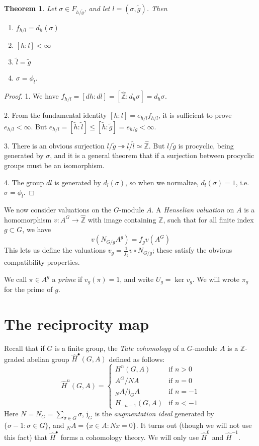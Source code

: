 \documentclass{article}
\newcommand{\bb}{\mathbb}
\newcommand{\f}{\mathfrak}
\newcommand{\frob}{F}
\newcommand{\hZ}{\hat{\mathbb{Z}}}
\newcommand{\tH}{\hat H}
\newtheorem{theorem}{Theorem}
\begin{document}
\begin{theorem}
Let $\sigma\in \frob_{h/\tilde g}$, and let $l=(\sigma,\tilde g)$. Then 
\begin{enumerate}
  \item $f_{h/l} = d_h(\sigma)$ 
  \item $[h:l]<\infty$
  \item $\tilde l = \tilde g$
  \item $\sigma = \phi_l$. 
\end{enumerate}
\end{theorem}
\begin{proof}
1. We have $f_{h/l} = [d h : d l] = [\hZ : d_h\sigma] = d_h\sigma$.

2. From the fundamental identity $[h:l] = e_{h/l} f_{h/l}$, it is sufficient to 
prove $e_{h/l}<\infty$. But 
$e_{h/l} = [\tilde h:\tilde l]\leqslant [\tilde h:\tilde g] = e_{h/g}<\infty$. 

3. There is an obvious surjection 
$l/\tilde g\twoheadrightarrow l/\tilde l\simeq \hZ$. But $l/\tilde g$ is 
procyclic, being generated by $\sigma$, and it is a general theorem that if a 
surjection between procyclic groups must be an isomorphism. 

4. The group $d l$ is generated by $d_l(\sigma)$, so when we normalize, 
$d_l(\sigma) = 1$, i.e. $\sigma = \phi_l$. 
\end{proof}

We now consider valuations on the $G$-module $A$. A \emph{Henselian valuation} 
on $A$ is a homomorphism $v:A^G\to \hZ$ with image containing $\bb Z$, such 
that for all finite index $g\subset G$, we have 
\[
  v(N_{G/g} A^g) = f_g v(A^G)
\]
This lets us define the valuations $v_g = \frac 1{f_g} v\circ N_{G/g}$; these 
satisfy the obvious compatibility properties. 

We call $\pi\in A^g$ a \emph{prime} if $v_g(\pi) = 1$, and write 
$U_g=\ker v_g$. We will wrote $\pi_g$ for the prime of $g$.





\section{The reciprocity map}

Recall that if $G$ is a finite group, the \emph{Tate cohomology} of a 
$G$-module $A$ is a $\bb Z$-graded abelian group $\tH^\bullet(G,A)$ defined as 
follows:
\[
  \tH^n(G,A) = \begin{cases}
                 H^n(G,A)         & \mbox{if $n>0$} \\
                 A^G / N A        & \mbox{if $n=0$} \\
                 _N A/\f j_G A    & \mbox{if $n=-1$} \\
                 H_{-n-1}(G,A)    & \mbox{if $n<-1$}
               \end{cases}
\]
Here $N = N_G = \sum_{\sigma \in G} \sigma$, $\f j_G$ is the \emph{augmentation 
ideal} generated by $\{\sigma-1 : \sigma\in G\}$, and 
$_N A = \{x\in A : N x = 0\}$. It turns out (though we will not use this fact) 
that $\tH^\bullet$ forms a cohomology theory. We will only use $\tH^0$ and 
$\tH^{-1}$. 
\end{document}
